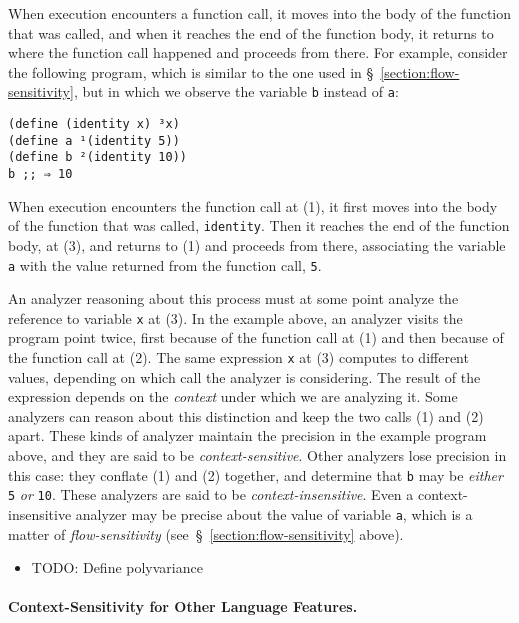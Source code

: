 \documentclass[12pt, oneside]{book}
\begin{document}
When execution encounters a function call, it moves into the body of the function that was called, and when it reaches the end of the function body, it returns to where the function call happened and proceeds from there. For example, consider the following program, which is similar to the one used in §~\ref{section:flow-sensitivity}, but in which we observe the variable \texttt{b} instead of \texttt{a}:

\begin{Verbatim}
(define (identity x) ³x)
(define a ¹(identity 5))
(define b ²(identity 10))
b ;; ⇒ 10
\end{Verbatim}

When execution encounters the function call at (1), it first moves into the body of the function that was called, \texttt{identity}. Then it reaches the end of the function body, at (3), and returns to (1) and proceeds from there, associating the variable \texttt{a} with the value returned from the function call, \texttt{5}.

An analyzer reasoning about this process must at some point analyze the reference to variable \texttt{x} at (3). In the example above, an analyzer visits the program point twice, first because of the function call at (1) and then because of the function call at (2). The same expression \texttt{x} at (3) computes to different values, depending on which call the analyzer is considering. The result of the expression depends on the \emph{context} under which we are analyzing it. Some analyzers can reason about this distinction and keep the two calls (1) and (2) apart. These kinds of analyzer maintain the precision in the example program above, and they are said to be \emph{context-sensitive}. Other analyzers lose precision in this case: they conflate (1) and (2) together, and determine that \texttt{b} may be \emph{either} \texttt{5} \emph{or} \texttt{10}. These analyzers are said to be \emph{context-insensitive}. Even a context-insensitive analyzer may be precise about the value of variable \texttt{a}, which is a matter of \emph{flow-sensitivity} (see~§~\ref{section:flow-sensitivity} above).

\begin{itemize}
  \item TODO: Define polyvariance
\end{itemize}

\paragraph{Context-Sensitivity for Other Language Features.}
\end{document}

